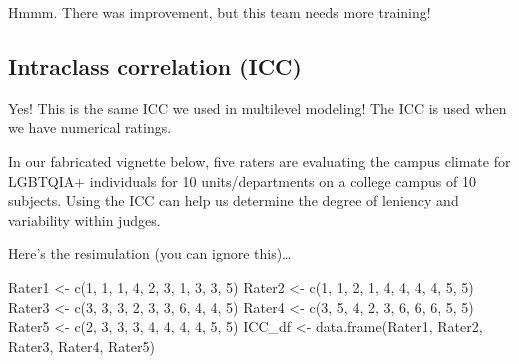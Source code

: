 \documentclass[
  english,
]{book}
\newenvironment{Shaded}{\begin{snugshade}}{\end{snugshade}}
\newcommand{\DecValTok}[1]{\textcolor[rgb]{0.00,0.00,0.81}{#1}}
\newcommand{\FunctionTok}[1]{\textcolor[rgb]{0.00,0.00,0.00}{#1}}
\newcommand{\NormalTok}[1]{#1}
\newcommand{\OtherTok}[1]{\textcolor[rgb]{0.56,0.35,0.01}{#1}}
\begin{document}
Hmmm. There was improvement, but this team needs more training!

\hypertarget{intraclass-correlation-icc}{%
\subsection{Intraclass correlation (ICC)}\label{intraclass-correlation-icc}}

Yes! This is the same ICC we used in multilevel modeling! The ICC is used when we have numerical ratings.

In our fabricated vignette below, five raters are evaluating the campus climate for LGBTQIA+ individuals for 10 units/departments on a college campus of 10 subjects. Using the ICC can help us determine the degree of leniency and variability within judges.

Here's the resimulation (you can ignore this)\ldots{}

\begin{Shaded}
\begin{Highlighting}[]
\NormalTok{Rater1 }\OtherTok{\textless{}{-}} \FunctionTok{c}\NormalTok{(}\DecValTok{1}\NormalTok{, }\DecValTok{1}\NormalTok{, }\DecValTok{1}\NormalTok{, }\DecValTok{4}\NormalTok{, }\DecValTok{2}\NormalTok{, }\DecValTok{3}\NormalTok{, }\DecValTok{1}\NormalTok{, }\DecValTok{3}\NormalTok{, }\DecValTok{3}\NormalTok{, }\DecValTok{5}\NormalTok{)}
\NormalTok{Rater2 }\OtherTok{\textless{}{-}} \FunctionTok{c}\NormalTok{(}\DecValTok{1}\NormalTok{, }\DecValTok{1}\NormalTok{, }\DecValTok{2}\NormalTok{, }\DecValTok{1}\NormalTok{, }\DecValTok{4}\NormalTok{, }\DecValTok{4}\NormalTok{, }\DecValTok{4}\NormalTok{, }\DecValTok{4}\NormalTok{, }\DecValTok{5}\NormalTok{, }\DecValTok{5}\NormalTok{)}
\NormalTok{Rater3 }\OtherTok{\textless{}{-}} \FunctionTok{c}\NormalTok{(}\DecValTok{3}\NormalTok{, }\DecValTok{3}\NormalTok{, }\DecValTok{3}\NormalTok{, }\DecValTok{2}\NormalTok{, }\DecValTok{3}\NormalTok{, }\DecValTok{3}\NormalTok{, }\DecValTok{6}\NormalTok{, }\DecValTok{4}\NormalTok{, }\DecValTok{4}\NormalTok{, }\DecValTok{5}\NormalTok{)}
\NormalTok{Rater4 }\OtherTok{\textless{}{-}} \FunctionTok{c}\NormalTok{(}\DecValTok{3}\NormalTok{, }\DecValTok{5}\NormalTok{, }\DecValTok{4}\NormalTok{, }\DecValTok{2}\NormalTok{, }\DecValTok{3}\NormalTok{, }\DecValTok{6}\NormalTok{, }\DecValTok{6}\NormalTok{, }\DecValTok{6}\NormalTok{, }\DecValTok{5}\NormalTok{, }\DecValTok{5}\NormalTok{)}
\NormalTok{Rater5 }\OtherTok{\textless{}{-}} \FunctionTok{c}\NormalTok{(}\DecValTok{2}\NormalTok{, }\DecValTok{3}\NormalTok{, }\DecValTok{3}\NormalTok{, }\DecValTok{3}\NormalTok{, }\DecValTok{4}\NormalTok{, }\DecValTok{4}\NormalTok{, }\DecValTok{4}\NormalTok{, }\DecValTok{4}\NormalTok{, }\DecValTok{5}\NormalTok{, }\DecValTok{5}\NormalTok{)}
\NormalTok{ICC\_df }\OtherTok{\textless{}{-}} \FunctionTok{data.frame}\NormalTok{(Rater1, Rater2, Rater3, Rater4, Rater5)}
\end{Highlighting}
\end{Shaded}
\end{document}
